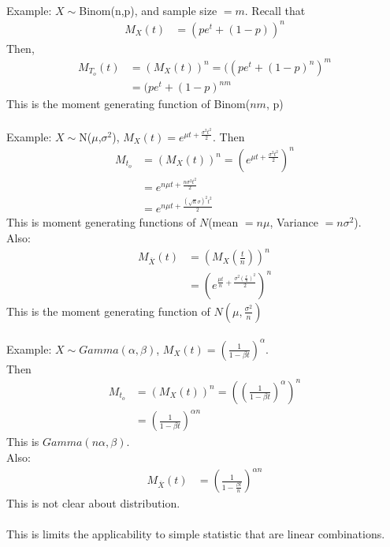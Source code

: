 \documentclass[11pt,oneside]{book}
\theoremstyle{break}
\theoremstyle{break}
\newcommand{\example}{\color{WildStrawberry}Example: \color{black}}
\begin{document}
\hfill\\
\example $X\sim$Binom(n,p), and sample size $=m$. Recall that \begin{align*}
M_{X}(t)&=(pe^t+(1-p))^n
\end{align*}
Then, \begin{align*}
M_{T_o}(t)&=(M_X(t))^n=((pe^t+(1-p)^n)^m\\
&=(pe^t+(1-p)^{nm}
\end{align*}
This is the moment generating function of Binom($nm$, p)\\
\hfill\\
\example $X\sim$N($\mu$,$\sigma^2$), $M_X(t)=e^{\mu t+\frac{\sigma^2 t^2}{2}}$. Then \begin{align*}
M_{t_o}&=\left( M_X(t)\right)^n=\left( e^{\mu t+\frac{\sigma^2 t^2}{2}}\right)^n\\
&=e^{n\mu t+\frac{n\sigma^2 t^2}{2}}\\
&=e^{n\mu t+\frac{(\sqrt{n}\sigma)^2 t^2}{2}}
\end{align*}
This is moment generating functions of $N$(mean $=n\mu$, Variance $=n\sigma^2$).\\
Also: \begin{align*}
M_{\overline{X}}(t)&=\left( M_X\left(\frac{t}{n} \right)\right)^n\\
&=\left(e^{\frac{\mu t}{n}+\frac{\sigma^2 \left(\frac{r}{n}\right)^2}{2}} \right)^n
\end{align*}
This is the moment generating function of $N\left(\mu, \frac{\sigma^2}{n}\right)$\\
\hfill\\
\example $X\sim Gamma(\alpha,\beta)$, $M_X(t)= \left( \frac{1}{1-\beta t}\right)^{\alpha}$.\\
Then \begin{align*}
M_{t_o}&=\left( M_X(t)\right)^n=\left(\left( \frac{1}{1-\beta t}\right)^{\alpha} \right)^n\\
&=\left( \frac{1}{1-\beta t}\right)^{\alpha n} 
\end{align*}
This is $Gamma(n\alpha, \beta)$.\\
Also: \begin{align*}
M_{\overline{X}}(t)&=\left( \frac{1}{1-\frac{\beta t}{n}}\right)^{\alpha n} 
\end{align*}
This is not clear about distribution.\\
\hfill\\
This is limits the applicability to simple statistic that are linear combinations.
\end{document}
